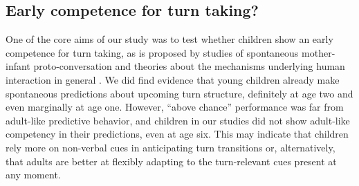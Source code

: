 \documentclass[authoryear, 12pt]{elsarticle}
\begin{document}


\subsection{Early competence for turn taking?}

One of the core aims of our study was to test whether children show an early competence for turn taking, as is proposed by studies of spontaneous mother-infant proto-conversation and theories about the mechanisms underlying human interaction in general \citep{hilbrink2015, levinson2006}. We did find evidence that young children already make spontaneous predictions about upcoming turn structure, definitely at age two and even marginally at age one. However, ``above chance'' performance was far from adult-like predictive behavior, and children in our studies did not show adult-like competency in their predictions, even at age six. This may indicate that children rely more on non-verbal cues in anticipating turn transitions or, alternatively, that adults are better at flexibly adapting to the turn-relevant cues present at any moment.

\end{document}
